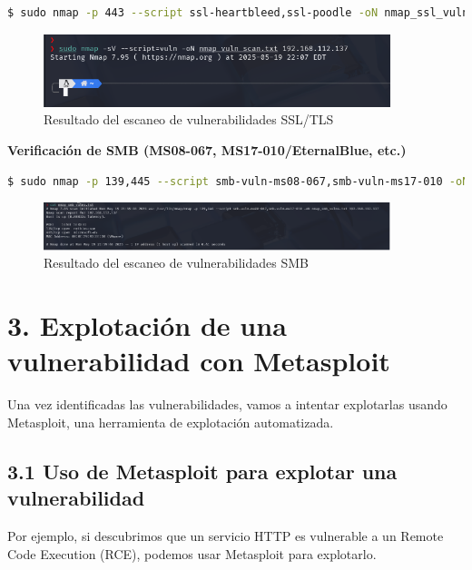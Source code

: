 \documentclass[12pt,a4paper]{article}
\begin{document}
\begin{lstlisting}[language=bash, caption=Escaneo de vulnerabilidades SSL/TLS]
$ sudo nmap -p 443 --script ssl-heartbleed,ssl-poodle -oN nmap_ssl_vulns.txt 192.168.112.137
\end{lstlisting}

\begin{figure}[H]
    \centering
    \includegraphics[width=0.9\textwidth]{ssl_scan.png}
    \caption{Resultado del escaneo de vulnerabilidades SSL/TLS}
    \label{fig:ssl_scan}
\end{figure}

\textbf{Verificación de SMB (MS08-067, MS17-010/EternalBlue, etc.)}

\begin{lstlisting}[language=bash, caption=Escaneo de vulnerabilidades SMB]
$ sudo nmap -p 139,445 --script smb-vuln-ms08-067,smb-vuln-ms17-010 -oN nmap_smb_vulns.txt 192.168.112.137
\end{lstlisting}

\begin{figure}[H]
    \centering
    \includegraphics[width=0.9\textwidth]{smb_scan.png}
    \caption{Resultado del escaneo de vulnerabilidades SMB}
    \label{fig:smb_scan}
\end{figure}

\section{3. Explotación de una vulnerabilidad con Metasploit}
Una vez identificadas las vulnerabilidades, vamos a intentar explotarlas usando Metasploit, una herramienta de explotación automatizada.

\subsection{3.1 Uso de Metasploit para explotar una vulnerabilidad}
Por ejemplo, si descubrimos que un servicio HTTP es vulnerable a un Remote Code Execution (RCE), podemos usar Metasploit para explotarlo.
\end{document}
